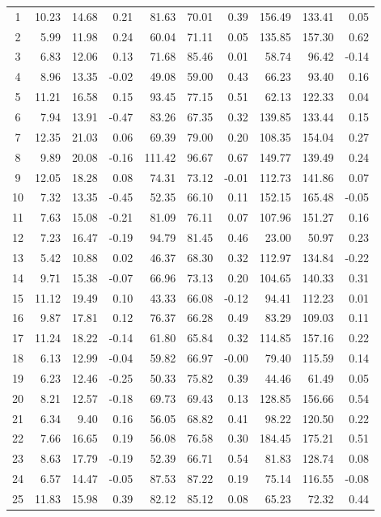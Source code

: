 \documentclass[runningheads]{llncs}
\begin{document}
\begin{table}[!t]
{\begin{tabular}{|c|rrr|rrr|rrr|}
1  & 10.23 & 14.68 & 0.21 & 81.63 & 70.01 & 0.39 & 156.49 & 133.41 & 0.05 \\
2  &  5.99 & 11.98 & 0.24 & 60.04 & 71.11 & 0.05 & 135.85 & 157.30 & 0.62 \\
3  &  6.83 & 12.06 & 0.13 & 71.68 & 85.46 & 0.01 &  58.74 &  96.42 & -0.14 \\
4  &  8.96 & 13.35 & -0.02 & 49.08 & 59.00 & 0.43 &  66.23 &  93.40 & 0.16 \\
5  & 11.21 & 16.58 & 0.15 & 93.45 & 77.15 & 0.51 &  62.13 & 122.33 & 0.04 \\
6  &  7.94 & 13.91 & -0.47 & 83.26 & 67.35 & 0.32 & 139.85 & 133.44 & 0.15 \\
7  & 12.35 & 21.03 & 0.06 & 69.39 & 79.00 & 0.20 & 108.35 & 154.04 & 0.27 \\
8  &  9.89 & 20.08 & -0.16 & 111.42 & 96.67 & 0.67 & 149.77 & 139.49 & 0.24 \\
9  & 12.05 & 18.28 & 0.08 & 74.31 & 73.12 & -0.01 & 112.73 & 141.86 & 0.07 \\
10 &  7.32 & 13.35 & -0.45 & 52.35 & 66.10 & 0.11 & 152.15 & 165.48 & -0.05 \\
11 &  7.63 & 15.08 & -0.21 & 81.09 & 76.11 & 0.07 & 107.96 & 151.27 & 0.16 \\
12 &  7.23 & 16.47 & -0.19 & 94.79 & 81.45 & 0.46 &  23.00 &  50.97 & 0.23 \\
13 &  5.42 & 10.88 & 0.02 & 46.37 & 68.30 & 0.32 & 112.97 & 134.84 & -0.22 \\
14 &  9.71 & 15.38 & -0.07 & 66.96 & 73.13 & 0.20 & 104.65 & 140.33 & 0.31 \\
15 & 11.12 & 19.49 & 0.10 & 43.33 & 66.08 & -0.12 &  94.41 & 112.23 & 0.01 \\
16 &  9.87 & 17.81 & 0.12 & 76.37 & 66.28 & 0.49 &  83.29 & 109.03 & 0.11 \\
17 & 11.24 & 18.22 & -0.14 & 61.80 & 65.84 & 0.32 & 114.85 & 157.16 & 0.22 \\
18 &  6.13 & 12.99 & -0.04 & 59.82 & 66.97 & -0.00 &  79.40 & 115.59 & 0.14 \\
19 &  6.23 & 12.46 & -0.25 & 50.33 & 75.82 & 0.39 &  44.46 &  61.49 & 0.05 \\
20 &  8.21 & 12.57 & -0.18 & 69.73 & 69.43 & 0.13 & 128.85 & 156.66 & 0.54 \\
21 &  6.34 &  9.40 & 0.16 & 56.05 & 68.82 & 0.41 &  98.22 & 120.50 & 0.22 \\
22 &  7.66 & 16.65 & 0.19 & 56.08 & 76.58 & 0.30 & 184.45 & 175.21 & 0.51 \\
23 &  8.63 & 17.79 & -0.19 & 52.39 & 66.71 & 0.54 &  81.83 & 128.74 & 0.08 \\
24 &  6.57 & 14.47 & -0.05 & 87.53 & 87.22 & 0.19 &  75.14 & 116.55 & -0.08 \\
25 & 11.83 & 15.98 & 0.39 & 82.12 & 85.12 & 0.08 &  65.23 &  72.32 & 0.44 \\ \hline

\end{tabular}
}

\end{table}
\end{document}
